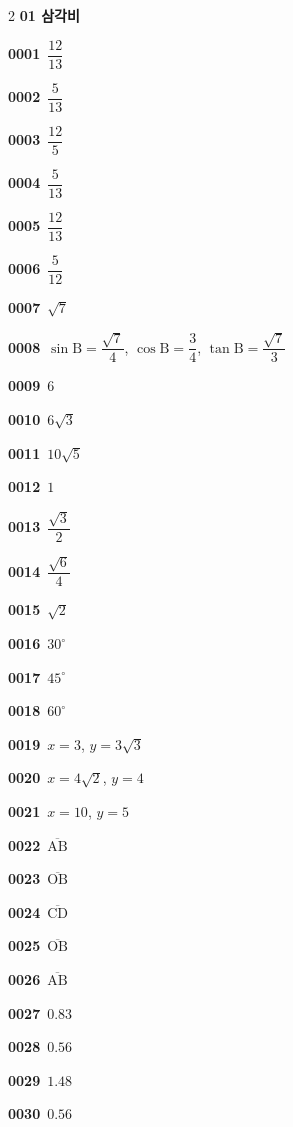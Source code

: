 \documentclass[10pt,a4paper]{article}
\newcommand{\pt}[1]{\mathrm{#1}}
\newcommand{\seg}[1]{\overline{\mathrm{#1}}}
\begin{document}
\begin{multicols}{2}\small
\noindent\textbf{01 삼각비}\par\smallskip
\noindent\textbf{0001}\ $\dfrac{12}{13}$\par
\noindent\textbf{0002}\ $\dfrac{5}{13}$\par
\noindent\textbf{0003}\ $\dfrac{12}{5}$\par
\noindent\textbf{0004}\ $\dfrac{5}{13}$\par
\noindent\textbf{0005}\ $\dfrac{12}{13}$\par
\noindent\textbf{0006}\ $\dfrac{5}{12}$\par
\noindent\textbf{0007}\ $\sqrt{7}$\par
\noindent\textbf{0008}\ $\sin\pt{B}=\dfrac{\sqrt{7}}{4}$, $\cos\pt{B}=\dfrac{3}{4}$, $\tan\pt{B}=\dfrac{\sqrt{7}}{3}$\par
\noindent\textbf{0009}\ $6$\par
\noindent\textbf{0010}\ $6\sqrt{3}$\par
\noindent\textbf{0011}\ $10\sqrt{5}$\par
\noindent\textbf{0012}\ $1$\par
\noindent\textbf{0013}\ $\dfrac{\sqrt{3}}{2}$\par
\noindent\textbf{0014}\ $\dfrac{\sqrt{6}}{4}$\par
\noindent\textbf{0015}\ $\sqrt{2}$\par
\noindent\textbf{0016}\ $30^\circ$\par
\noindent\textbf{0017}\ $45^\circ$\par
\noindent\textbf{0018}\ $60^\circ$\par
\noindent\textbf{0019}\ $x=3$, $y=3\sqrt{3}$\par
\noindent\textbf{0020}\ $x=4\sqrt{2}$, $y=4$\par
\noindent\textbf{0021}\ $x=10$, $y=5$\par
\noindent\textbf{0022}\ $\seg{AB}$\par
\noindent\textbf{0023}\ $\seg{OB}$\par
\noindent\textbf{0024}\ $\seg{CD}$\par
\noindent\textbf{0025}\ $\seg{OB}$\par
\noindent\textbf{0026}\ $\seg{AB}$\par
\noindent\textbf{0027}\ $0.83$\par
\noindent\textbf{0028}\ $0.56$\par
\noindent\textbf{0029}\ $1.48$\par
\noindent\textbf{0030}\ $0.56$\par

\end{multicols}
\end{document}
